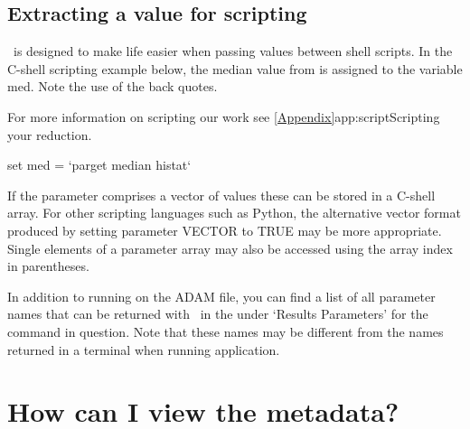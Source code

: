 \documentclass[11pt,oneside,chapters]{starlink}
\begin{document}
\subsection{Extracting a value for scripting}

\parget\ is designed to make life easier when passing values between
shell scripts. In the C-shell scripting example below, the median
value from  is assigned to the variable med.  Note the
use of the back quotes.

For more information on scripting our work see
\cref{Appendix}{app:script}{Scripting your reduction}.

\begin{terminalv}
set med = `parget median histat`
\end{terminalv}

If the parameter comprises a vector of values these can be stored in a
C-shell array. For other scripting languages such as Python, the
alternative vector format produced by setting parameter VECTOR to TRUE
may be more appropriate. Single elements of a parameter array may also
be accessed using the array index in parentheses.

In addition to running  on the ADAM file, you can find
a list of all parameter names that can be returned with \parget\ in
the  under `Results Parameters'
for the command in question. Note that these names may be different
from the names returned in a terminal when running application.

\section{How can I view the metadata?}
\label{sec:fitslist}
\end{document}
